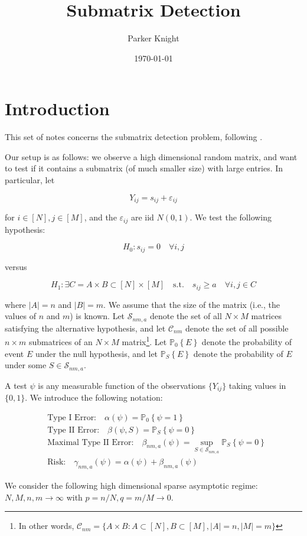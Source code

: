 \documentclass[11pt]{article}
\author{Parker Knight}
\date{\today}
\title{Submatrix Detection}
\newcommand{\cC}{\mathcal{C}}
\newcommand{\cS}{\mathcal{S}}
\newcommand{\probover}[2]{\mathbb{P}_{#2}\left\{#1\right\}}
\newcommand{\eps}{\varepsilon} %
\begin{document}
\maketitle

\section{Introduction}

This set of notes concerns the submatrix detection problem, following
\cite{butucea_detection_2013}. 


Our setup is as follows: we observe a high dimensional random matrix, and want to test if it contains a submatrix (of much smaller size) with large entries. In particular, let

$$Y_{ij} = s_{ij} + \eps_{ij}$$

for $i \in [N], j \in [M]$, and the $\eps_{ij}$ are iid $N(0,1)$. We test the following hypothesis:

$$H_0: s_{ij} = 0 \quad \forall i,j$$

versus

$$H_1: \exists C = A \times B \subset [N] \times [M] \quad \textrm{s.t.} 
\quad s_{ij} \geq a \quad \forall i,j \in C$$

where $|A| = n$ and $|B| = m$. We assume that the size of the matrix (i.e., the
values of $n$ and $m$) is known. Let $\cS_{nm,a}$ denote the set of all $N
\times M$ matrices satisfying the alternative hypothesis, and let $\cC_{nm}$
denote the set of all possible $n \times m$ submatrices of an $N \times M$ matrix\footnote{In
other words, $\cC_{nm} = \{A \times B : A \subset [N], B \subset [M], |A| = n,
|M| = m\}$}. Let
$\probover{E}{0}$ denote the probability of event $E$ under the null hypothesis,
and let $\probover{E}{S}$ denote the probability of $E$ under some $S \in \cS_{nm,a}$.

A test $\psi$ is any measurable function of the observations $\{Y_{ij}\}$ taking
values in $\{0,1\}$. We introduce the following notation:

\begin{align*}
	&\textrm{Type I Error:} \quad \alpha(\psi) = \probover{\psi = 1}{0} \\
	&\textrm{Type II Error:} \quad \beta(\psi, S) = \probover{\psi = 0}{S}\\
	&\textrm{Maximal Type II Error:} \quad \beta_{nm,a}(\psi) = \sup_{S \in \cS_{nm,a}}\probover{\psi = 0}{S} \\
	&\textrm{Risk:} \quad \gamma_{nm,a}(\psi) = \alpha(\psi) + \beta_{nm,a}(\psi)
\end{align*} 

We consider the following high dimensional sparse asymptotic regime: $N,M,n,m
\rightarrow \infty$ with $p = n/N, q = m/M \rightarrow 0$. 



\end{document}
